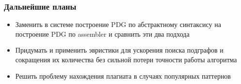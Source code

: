 \documentclass[10pt]{beamer}
\begin{document}
\begin{frame}\frametitle{Дальнейшие планы}
    \begin{itemize}
        \item Заменить в системе построение PDG по абстрактному синтаксису на построение PDG по assembler и сравнить эти два подхода
        \item Придумать и применить эвристики для ускорения поиска подграфов и сокращения их количества без сильной потери точности работы алгоритма
        \item Решить проблему нахождения плагиата в случаях популярных паттернов
        
    \end{itemize}
\end{frame}
\end{document}
